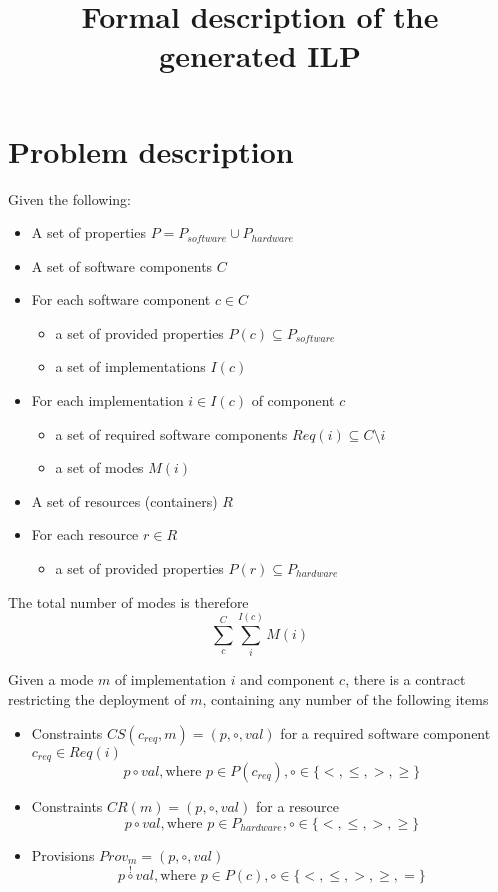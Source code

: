 \documentclass[10pt,a4paper]{article}
\title{Formal description of the generated ILP}
\begin{document}
\section{Problem description}

Given the following:

\begin{itemize}
	\item A set of properties $P = P_{software} \cup P_{hardware}$
	\item A set of software components $C$
	\item For each software component $c \in C$
	\begin{itemize}
		\item a set of provided properties $P(c) \subseteq P_{software}$
		\item a set of implementations $I(c)$
	\end{itemize}
	\item For each implementation $i \in I(c)$ of component $c$
	\begin{itemize}
		\item a set of required software components $Req(i) \subseteq C \setminus i$
		\item a set of modes $M(i)$
	\end{itemize}
	\item A set of resources (containers) $R$
	\item For each resource $r \in R$
	\begin{itemize}
		\item a set of provided properties $P(r) \subseteq P_{hardware}$
	\end{itemize}
\end{itemize}

The total number of modes is therefore
\begin{equation}
	\sum_{c}^{C} \sum_{i}^{I(c)} M(i)
\end{equation}

Given a mode $m$ of implementation $i$ and component $c$, there is a contract restricting the deployment of $m$, containing any number of the following items

\begin{itemize}
	\item Constraints $CS(c_{req},m) = (p, \circ, val)$ for a required software component $c_{req} \in Req(i)$
	\begin{equation}
	p \circ val, \text{where } p \in P(c_{req}), \circ \in \{<, \leq, >, \geq \}
	\end{equation}
	\item Constraints $CR(m) = (p, \circ, val)$ for a resource
	\begin{equation}
	p \circ val, \text{where } p \in P_{hardware}, \circ \in \{<, \leq, >, \geq \}
	\end{equation}
	\item Provisions $Prov_m = (p, \circ, val)$
	\begin{equation}
	p \overset{!}{\circ} val, \text{where } p \in P(c), \circ \in \{<, \leq, >, \geq, = \}
	\end{equation}
\end{itemize}
\end{document}
